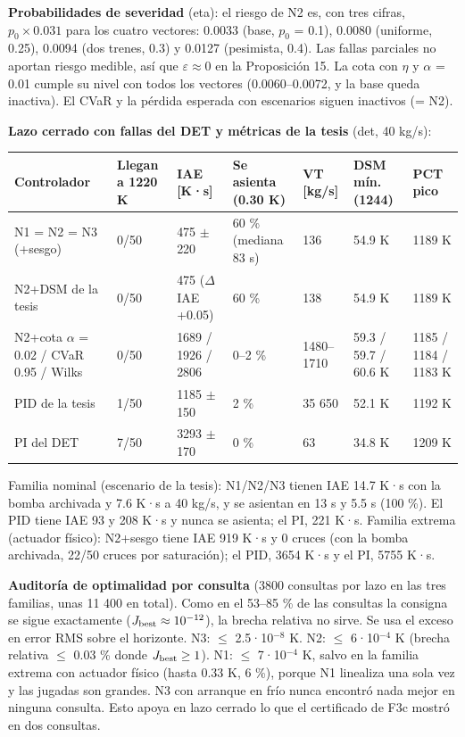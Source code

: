\documentclass[11pt,a4paper]{article}
\newcommand{\codeus}{\textunderscore\allowbreak}
\newcommand{\code}[1]{{\small\ttfamily\let\_\codeus #1}}
\begin{document}
\textbf{Probabilidades de severidad} (\code{eta}): el riesgo de N2 es, con tres cifras, $p_0\times0.031$ para los cuatro vectores: 0.0033 (base, $p_0$ = 0.1), 0.0080 (uniforme, 0.25), 0.0094 (dos trenes, 0.3) y 0.0127 (pesimista, 0.4). Las fallas parciales no aportan riesgo medible, así que $\varepsilon\approx0$ en la Proposición 15. La cota con $\eta$ y $\alpha$ = 0.01 cumple su nivel con todos los vectores (0.0060–0.0072, y la base queda inactiva). El CVaR y la pérdida esperada con escenarios siguen inactivos (= N2).

\textbf{Lazo cerrado con fallas del DET y métricas de la tesis} (\code{det}, 40 kg/s):

{\footnotesize
\begin{xltabular}{\linewidth}{@{}YYYYYYY@{}}
\toprule
\textbf{Controlador} & \textbf{Llegan a 1220 K} & \textbf{IAE [K·s]} & \textbf{Se asienta (0.30 K)} & \textbf{VT [kg/s]} & \textbf{DSM mín. (1244)} & \textbf{PCT pico} \\
\midrule
\endhead
N1 = N2 = N3 (+sesgo) & 0/50 & 475 $\pm$ 220 & 60 \% (mediana 83 s) & 136 & 54.9 K & 1189 K \\
N2+DSM de la tesis & 0/50 & 475 ($\Delta$IAE +0.05) & 60 \% & 138 & 54.9 K & 1189 K \\
N2+cota $\alpha$ = 0.02 / CVaR 0.95 / Wilks & 0/50 & 1689 / 1926 / 2806 & 0–2 \% & 1480–1710 & 59.3 / 59.7 / 60.6 K & 1185 / 1184 / 1183 K \\
PID de la tesis & 1/50 & 1185 $\pm$ 150 & 2 \% & 35 650 & 52.1 K & 1192 K \\
PI del DET & 7/50 & 3293 $\pm$ 170 & 0 \% & 63 & 34.8 K & 1209 K \\
\bottomrule
\end{xltabular}}

Familia nominal (escenario de la tesis): N1/N2/N3 tienen IAE 14.7 K·s con la bomba archivada y 7.6 K·s a 40 kg/s, y se asientan en 13 s y 5.5 s (100 \%). El PID tiene IAE 93 y 208 K·s y nunca se asienta; el PI, 221 K·s. Familia extrema (actuador físico): N2+sesgo tiene IAE 919 K·s y 0 cruces (con la bomba archivada, 22/50 cruces por saturación); el PID, 3654 K·s y el PI, 5755 K·s.

\textbf{Auditoría de optimalidad por consulta} (3800 consultas por lazo en las tres familias, unas 11 400 en total). Como en el 53–85 \% de las consultas la consigna se sigue exactamente ($J_{\rm best}\approx10^{-12}$), la brecha relativa no sirve. Se usa el exceso en error RMS sobre el horizonte. N3: $\le$ 2.5·10$^{-8}$ K. N2: $\le$ 6·10$^{-4}$ K (brecha relativa $\le$ 0.03 \% donde $J_{\rm best}\ge1$). N1: $\le$ 7·10$^{-4}$ K, salvo en la familia extrema con actuador físico (hasta 0.33 K, 6 \%), porque N1 linealiza una sola vez y las jugadas son grandes. N3 con arranque en frío nunca encontró nada mejor en ninguna consulta. Esto apoya en lazo cerrado lo que el certificado de F3c mostró en dos consultas.
\end{document}
